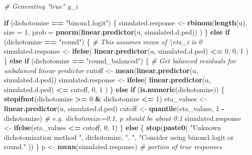 \documentclass[
]{article}
\newenvironment{Shaded}{\begin{snugshade}}{\end{snugshade}}
\newcommand{\AttributeTok}[1]{\textcolor[rgb]{0.13,0.29,0.53}{#1}}
\newcommand{\CommentTok}[1]{\textcolor[rgb]{0.56,0.35,0.01}{\textit{#1}}}
\newcommand{\ControlFlowTok}[1]{\textcolor[rgb]{0.13,0.29,0.53}{\textbf{#1}}}
\newcommand{\DecValTok}[1]{\textcolor[rgb]{0.00,0.00,0.81}{#1}}
\newcommand{\FunctionTok}[1]{\textcolor[rgb]{0.13,0.29,0.53}{\textbf{#1}}}
\newcommand{\NormalTok}[1]{#1}
\newcommand{\OtherTok}[1]{\textcolor[rgb]{0.56,0.35,0.01}{#1}}
\newcommand{\SpecialCharTok}[1]{\textcolor[rgb]{0.81,0.36,0.00}{\textbf{#1}}}
\newcommand{\StringTok}[1]{\textcolor[rgb]{0.31,0.60,0.02}{#1}}
\begin{document}
\begin{Shaded}
\begin{Highlighting}[]
  \CommentTok{\# Generating "true" y\_i}

  \ControlFlowTok{if}\NormalTok{ (dichotomize }\SpecialCharTok{==} \StringTok{"binom1.logit"}\NormalTok{) \{}
\NormalTok{    simulated.response }\OtherTok{\textless{}{-}} \FunctionTok{rbinom}\NormalTok{(}\FunctionTok{length}\NormalTok{(u),}
      \AttributeTok{size =} \DecValTok{1}\NormalTok{,}
      \AttributeTok{prob =} \FunctionTok{pnorm}\NormalTok{(}\FunctionTok{linear.predictor}\NormalTok{(u, simulated.d.ped))}
\NormalTok{    )}
\NormalTok{  \} }\ControlFlowTok{else} \ControlFlowTok{if}\NormalTok{ (dichotomize }\SpecialCharTok{==} \StringTok{"round"}\NormalTok{) \{}
    \CommentTok{\# This assumes mean of \textbackslash{}eta\_i is 0}
\NormalTok{    simulated.response }\OtherTok{\textless{}{-}} \FunctionTok{ifelse}\NormalTok{(}
      \FunctionTok{linear.predictor}\NormalTok{(u, simulated.d.ped) }\SpecialCharTok{\textless{}=} \DecValTok{0}\NormalTok{, }\DecValTok{0}\NormalTok{, }\DecValTok{1}
\NormalTok{    )}
\NormalTok{  \} }\ControlFlowTok{else} \ControlFlowTok{if}\NormalTok{ (dichotomize }\SpecialCharTok{==} \StringTok{"round\_balanced"}\NormalTok{) \{}
    \CommentTok{\# Get balanced residuals for unbalanced linear predictor}
\NormalTok{    cutoff }\OtherTok{\textless{}{-}} \FunctionTok{mean}\NormalTok{(}\FunctionTok{linear.predictor}\NormalTok{(u, simulated.d.ped))}
\NormalTok{    simulated.response }\OtherTok{\textless{}{-}} \FunctionTok{ifelse}\NormalTok{(}
      \FunctionTok{linear.predictor}\NormalTok{(u, simulated.d.ped) }\SpecialCharTok{\textless{}=}\NormalTok{ cutoff, }\DecValTok{0}\NormalTok{, }\DecValTok{1}
\NormalTok{    )}
\NormalTok{  \} }\ControlFlowTok{else} \ControlFlowTok{if}\NormalTok{ (}\FunctionTok{is.numeric}\NormalTok{(dichotomize)) \{}
    \FunctionTok{stopifnot}\NormalTok{(dichotomize }\SpecialCharTok{\textgreater{}=} \DecValTok{0} \SpecialCharTok{\&}\NormalTok{ dichotomize }\SpecialCharTok{\textless{}=} \DecValTok{1}\NormalTok{)}
\NormalTok{    eta\_values }\OtherTok{\textless{}{-}} \FunctionTok{linear.predictor}\NormalTok{(u, simulated.d.ped)}
\NormalTok{    cutoff }\OtherTok{\textless{}{-}} \FunctionTok{quantile}\NormalTok{(eta\_values, }\DecValTok{1} \SpecialCharTok{{-}}\NormalTok{ dichotomize)}
    \CommentTok{\# e.g. dichotomize=0.1, p should be about 0.1}
\NormalTok{    simulated.response }\OtherTok{\textless{}{-}} \FunctionTok{ifelse}\NormalTok{(eta\_values }\SpecialCharTok{\textless{}=}\NormalTok{ cutoff, }\DecValTok{0}\NormalTok{, }\DecValTok{1}\NormalTok{)}
\NormalTok{  \} }\ControlFlowTok{else}\NormalTok{ \{}
    \FunctionTok{stop}\NormalTok{(}\FunctionTok{paste0}\NormalTok{(}
      \StringTok{"Unknown dichotomization method \textquotesingle{}"}\NormalTok{, dichotomize, }\StringTok{"\textquotesingle{}. "}\NormalTok{,}
      \StringTok{"Consider using \textquotesingle{}binom1.logit\textquotesingle{} or \textquotesingle{}round\textquotesingle{}."}
\NormalTok{    ))}
\NormalTok{  \}}
\NormalTok{  p }\OtherTok{\textless{}{-}} \FunctionTok{mean}\NormalTok{(simulated.response) }\CommentTok{\# portion of true responses}



\end{Highlighting}
\end{Shaded}
\end{document}
